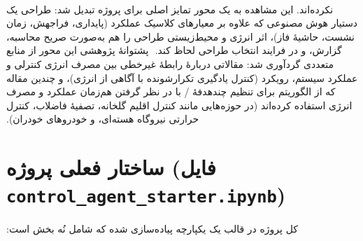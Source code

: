 ‫\documentclass[a4paper,12pt]{article}
\begin{document}
‫نکرده‌اند. این مشاهده به یک محور تمایز اصلی برای پروژه تبدیل شد: طراحی
‫یک دستیار هوش مصنوعی که علاوه بر معیارهای کلاسیک عملکرد (پایداری،
‫فراجهش، زمان نشست، حاشیهٔ فاز)، اثر انرژی و محیط‌زیستی طراحی را هم
‫به‌صورت صریح محاسبه، گزارش، و در فرایند انتخاب طراحی لحاظ کند.
‫
‫پشتوانهٔ پژوهشی این محور از منابع متعددی گردآوری شد: مقالاتی دربارهٔ
‫رابطهٔ غیرخطی بین مصرف انرژی کنترلی و عملکرد سیستم، رویکرد  (کنترل یادگیری تکرارشونده با آگاهی از انرژی)، و چندین مقاله که از
‫الگوریتم  برای تنظیم چندهدفهٔ / با
‫در نظر گرفتن هم‌زمان عملکرد و مصرف انرژی استفاده کرده‌اند (در حوزه‌هایی
‫مانند کنترل اقلیم گلخانه، تصفیهٔ فاضلاب، کنترل حرارتی نیروگاه هسته‌ای،
‫و خودروهای خودران).
‫
‫\section{ساختار فعلی پروژه (فایل \texorpdfstring{\texttt{control\_agent\_starter.ipynb}}{control\_agent\_starter.ipynb})}
‫کل پروژه در قالب یک  یکپارچه پیاده‌سازی شده که
‫شامل نُه بخش است:
‫
\end{document}
